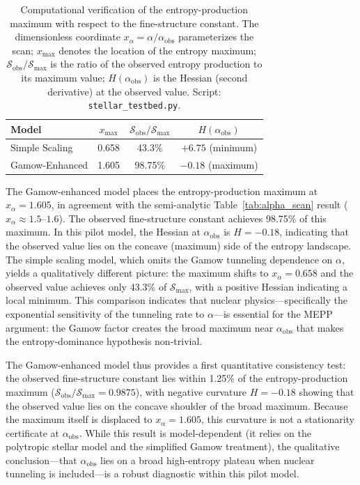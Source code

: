 \documentclass[12pt,a4paper]{article}
\theoremstyle{remark}
\begin{document}
\begin{table}[ht]
\centering
\caption{Computational verification of the entropy-production maximum with respect to the fine-structure constant. The dimensionless coordinate $x_\alpha = \alpha / \alpha_{\text{obs}}$ parameterizes the scan; $x_{\max}$ denotes the location of the entropy maximum; $\mathcal{S}_{\text{obs}} / \mathcal{S}_{\max}$ is the ratio of the observed entropy production to its maximum value; $H(\alpha_{\text{obs}})$ is the Hessian (second derivative) at the observed value. Script: \texttt{stellar\_testbed.py}.}
\label{tab:comp-verification-alpha}
\begin{tabular}{lccc}
\toprule
\textbf{Model} & $x_{\max}$ & $\mathcal{S}_{\text{obs}} / \mathcal{S}_{\max}$ & $H(\alpha_{\text{obs}})$ \\
\midrule
Simple Scaling & 0.658 & 43.3\% & $+6.75$ (minimum) \\
Gamow-Enhanced & 1.605 & 98.75\% & $-0.18$ (maximum) \\
\bottomrule
\end{tabular}
\end{table}

The Gamow-enhanced model places the entropy-production maximum at $x_\alpha = 1.605$, in agreement with the semi-analytic Table~\ref{tab:alpha_scan} result ($x_\alpha \approx 1.5$--$1.6$). The observed fine-structure constant achieves 98.75\% of this maximum. In this pilot model, the Hessian at $\alpha_{\text{obs}}$ is $H = -0.18$, indicating that the observed value lies on the concave (maximum) side of the entropy landscape. The simple scaling model, which omits the Gamow tunneling dependence on $\alpha$, yields a qualitatively different picture: the maximum shifts to $x_\alpha = 0.658$ and the observed value achieves only 43.3\% of $\mathcal{S}_{\max}$, with a positive Hessian indicating a local minimum. This comparison indicates that nuclear physics---specifically the exponential sensitivity of the tunneling rate to $\alpha$---is essential for the MEPP argument: the Gamow factor creates the broad maximum near $\alpha_{\text{obs}}$ that makes the entropy-dominance hypothesis non-trivial.

The Gamow-enhanced model thus provides a first quantitative consistency test: the observed fine-structure constant lies within 1.25\% of the entropy-production maximum ($\mathcal{S}_{\text{obs}}/\mathcal{S}_{\max} = 0.9875$), with negative curvature $H = -0.18$ showing that the observed value lies on the concave shoulder of the broad maximum. Because the maximum itself is displaced to $x_\alpha=1.605$, this curvature is not a stationarity certificate at $\alpha_{\text{obs}}$. While this result is model-dependent (it relies on the polytropic stellar model and the simplified Gamow treatment), the qualitative conclusion---that $\alpha_{\text{obs}}$ lies on a broad high-entropy plateau when nuclear tunneling is included---is a robust diagnostic within this pilot model.
\end{document}
